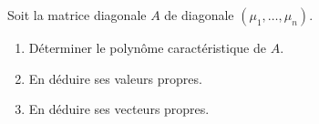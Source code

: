 \begin{exercise*}
  Soit la matrice diagonale $A$ de diagonale $(\mu_1, \dots, \mu_n)$.
  \begin{enumerate}
    \item Déterminer le polynôme caractéristique de $A$.
    \item En déduire ses valeurs propres.
    \item En déduire ses vecteurs propres.
  \end{enumerate}
\end{exercise*}

